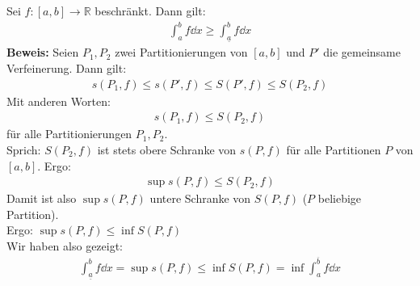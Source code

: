 \begin{Satz}{
	Sei $f: [a,b] \rightarrow \mathbb{R}$ beschränkt. Dann gilt:
	\begin{align*}
		\int_a^b f \dd{x} \geq \int_{\underline{a}}^b f \dd{x}
	\end{align*}
	\textbf{Beweis:} Seien $P_1, P_2$ zwei Partitionierungen von $[a,b]$ und 
	$P'$ die gemeinsame Verfeinerung. Dann gilt:
	\begin{align*}
		s(P_1,f) \leq s(P',f) \leq S(P',f) \leq S(P_2, f) 
	\end{align*}
	Mit anderen Worten:
	\begin{align*}
		s(P_1, f) \leq S(P_2, f)
	\end{align*}
	für alle Partitionierungen $P_1, P_2$. \\
	Sprich: $S(P_2,f)$ ist stets obere Schranke von $s(P,f)$ für alle Partitionen 
	$P$ von $[a,b]$. Ergo:
	\begin{align*}
		\sup s(P,f) \leq S (P_2, f)
	\end{align*}
	Damit ist also $\sup s(P,f)$ untere Schranke von $S(P,f)$ ($P$ beliebige 
	Partition). \\
	Ergo: $\sup s(P,f) \leq \inf S (P,f)$  \\
	Wir haben also gezeigt:
	\begin{align*}
		\int_{\underline{a}}^b f \dd{x} = \sup s(P,f) \leq 
		\inf S(P,f) = \inf \int_a^{\overline{b}} f \dd{x}
	\end{align*}
}\end{Satz}